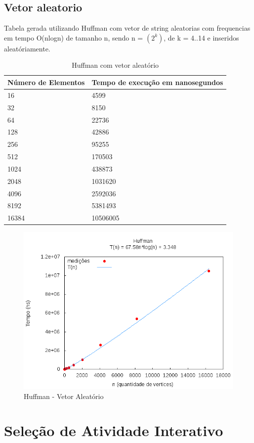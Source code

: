 \documentclass[12pt,a4paper,twoside]{report}
\begin{document}
\subsection{Vetor aleatorio}
Tabela gerada utilizando Huffman com vetor de string aleatorias com frequencias em tempo O(nlogn) de tamanho n, sendo n = $(2^k)$, de k = 4..14 e inseridos aleatóriamente.
\begin{table}[H]
\centering
\caption{Huffman com vetor aleatório}
\label{my-label}
\begin{tabular}{|l|l|}
\hline
\multicolumn{1}{|c|}{\textbf{Número de Elementos}} & \multicolumn{1}{c|}{\textbf{Tempo de execução em nanosegundos}} \\ \hline
16 & 4599 \\ \hline
32 & 8150 \\ \hline
64 & 22736 \\ \hline
128 & 42886 \\ \hline
256 & 95255 \\ \hline
512 & 170503 \\ \hline
1024 & 438873 \\ \hline
2048 & 1031620 \\ \hline
4096 & 2592036 \\ \hline
8192 & 5381493 \\ \hline
16384 & 10506005 \\ \hline

\end{tabular}
\end{table}

\begin{figure}[H]
    \centering
    \includegraphics[width=0.7\linewidth]{graficos/Huffman/Huffman.png}
  \caption{Huffman - Vetor Aleatório}
\end{figure}

\section{Seleção de Atividade Interativo}
\end{document}
